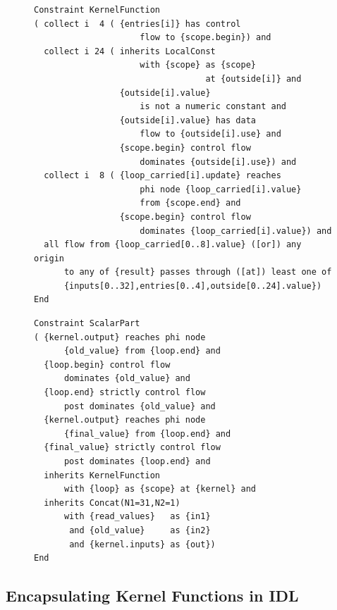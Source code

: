 \begin{figure}[p]
\begin{lstlisting}[language=IDL]
Constraint KernelFunction
( collect i  4 ( {entries[i]} has control
                     flow to {scope.begin}) and
  collect i 24 ( inherits LocalConst
                     with {scope} as {scope}
                                  at {outside[i]} and
                 {outside[i].value}
                     is not a numeric constant and
                 {outside[i].value} has data
                     flow to {outside[i].use} and
                 {scope.begin} control flow
                     dominates {outside[i].use}) and
  collect i  8 ( {loop_carried[i].update} reaches
                     phi node {loop_carried[i].value}
                     from {scope.end} and
                 {scope.begin} control flow
                     dominates {loop_carried[i].value}) and
  all flow from {loop_carried[0..8].value} ([or]) any origin
      to any of {result} passes through ([at]) least one of
      {inputs[0..32],entries[0..4],outside[0..24].value})
End
\end{lstlisting}
\begin{lstlisting}[language=IDL,label={IDLscalarPart},caption=
   {IDL specification of a scalar reduction within a complex reduction and
    histogram computation:
    The kernel function operates within a loop.
    Its input \texttt{kernel.inputs} is composed of \texttt{read\_values} and
    the reduction value of the previous iteration, concatednated with
    \texttt{Concat}.
    \parfillskip=0pt}]
Constraint ScalarPart
( {kernel.output} reaches phi node
      {old_value} from {loop.end} and
  {loop.begin} control flow
      dominates {old_value} and
  {loop.end} strictly control flow
      post dominates {old_value} and
  {kernel.output} reaches phi node
      {final_value} from {loop.end} and
  {final_value} strictly control flow
      post dominates {loop.end} and
  inherits KernelFunction
      with {loop} as {scope} at {kernel} and
  inherits Concat(N1=31,N2=1)
      with {read_values}   as {in1}
       and {old_value}     as {in2}
       and {kernel.inputs} as {out})
End
\end{lstlisting}
\end{figure}

\subsection{Encapsulating Kernel Functions in IDL}

